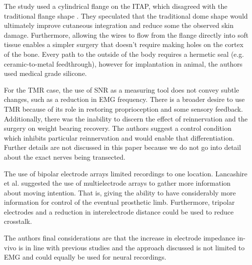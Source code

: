 The study used a cylindrical flange on the ITAP, which disagreed with the traditional flange shape \cite{kang_osseocutaneous_2010}.
They speculated that the traditional dome shape would ultimately improve cutaneous integration and reduce some the observed skin damage.
Furthermore, allowing the wires to flow from the flange directly into soft tissue enables a simpler surgery that doesn't require making holes on the cortex of the bone.
Every path to the outside of the body requires a hermetic seal (e.g. ceramic-to-metal feedthrough), however for implantation in animal, the authors used medical grade silicone.

For the TMR case, the use of SNR as a measuring tool does not convey subtle changes, such as a reduction in EMG frequency.
There is a broader desire to use TMR because of its role in restoring proprioception and some sensory feedback.
Additionally, there was the inability to discern the effect of reinnervation and the surgery on weight bearing recovery.
The authors suggest a control condition which inhibits particular reinnervation and would enable that differentiation.
Further details are not discussed in this paper because we do not go into detail about the exact nerves being transected.

The use of bipolar electrode arrays limited recordings to one location.
Lancashire et al. suggested the use of multielectrode arrays to gather more information about moving intention.
That is, giving the ability to have considerably more information for control of the eventual prosthetic limb.
Furthermore, tripolar electrodes and a reduction in interelectrode distance could be used to reduce crosstalk.

The authors final considerations are that the increase in electrode impedance in-vivo is in line with previous studies and the approach discussed is not limited to EMG and could equally be used for neural recordings.